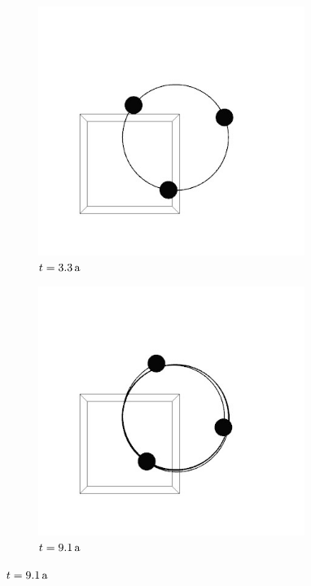     \begin{figure}[h]
      \center
      \begin{subfigure}[b]{0.49\textwidth}
        \center
        \includegraphics[width=0.95\textwidth]{pictures/three_body/triangle_1.jpg}
        \caption{$t=3.3\,\mathrm{a}$}
      \end{subfigure}
      \begin{subfigure}[b]{0.49\textwidth}
        \center
        \includegraphics[width=0.95\textwidth]{pictures/three_body/triangle_2.jpg}
        \caption{$t=9.1\,\mathrm{a}$}
      \end{subfigure}


\end{figure}
